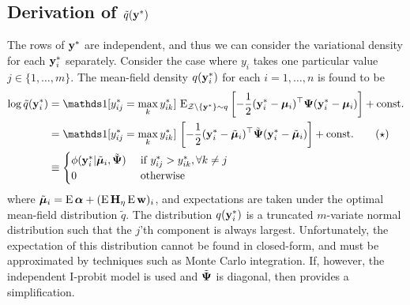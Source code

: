 \subsection{Derivation of \texorpdfstring{$\tilde q({\mathbf y}^*)$}{$\tilde q(y^*)$}}

The rows of ${\mathbf y}^*$ are independent, and thus we can consider the variational density for each ${\mathbf y}_i^*$ separately.
Consider the case where $y_i$ takes one particular value $j \in \{1,\dots,m\}$. The mean-field density $q({\mathbf y}_{i}^*)$ for each $i=1,\dots,n$ is found to be
\begin{align*}
  \log \tilde q(\by_{i}^*) 
  &=  \ind[y_{ij}^* = \max_k y_{ik}^*] \, \E_{\cZ\backslash\{\by^*\}\sim q} \left[ - \half (\by^*_i - \bmu_i)^\top \bPsi (\by^*_i - \bmu_i)  \right] + \const \\
  &= \ind[y_{ij}^* = \max_k y_{ik}^*] \, \left[ - \half (\by^*_i - \tilde\bmu_i)^\top \tilde\bPsi (\by^*_i - \tilde\bmu_i)  \right] + \const \tag{$\star$} \\
  &\equiv
  \begin{cases}
    \phi(\by_i^*|\tilde\bmu_i,\tilde\bPsi) & \text{ if } y_{ij}^* > y_{ik}^*, \forall k \neq j \\
    0 & \text{ otherwise} \\
  \end{cases}
\end{align*}
where $\tilde{{\bm\mu}}_i = \operatorname{E}{\bm\alpha} + (\operatorname{E}{\mathbf H}_\eta \operatorname{E}{\mathbf w})_i$, and expectations are taken under the optimal mean-field distribution $\tilde q$. 
The distribution $q({\mathbf y}_i^*)$ is a truncated $m$-variate normal distribution such that the $j$'th component is always largest. 
Unfortunately, the expectation of this distribution cannot be found in closed-form, and must be approximated by techniques such as Monte Carlo integration.
If, however, the independent I-probit model is used and $\tilde{{\bm\Psi}}$ is diagonal, then  provides a simplification.

